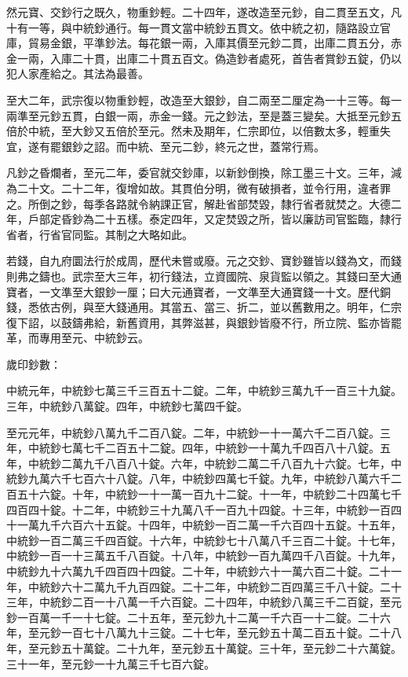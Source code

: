 \begin{pinyinscope}
 然元寶、交鈔行之既久，物重鈔輕。二十四年，遂改造至元鈔，自二貫至五文，凡十有一等，與中統鈔通行。每一貫文當中統鈔五貫文。依中統之初，隨路設立官庫，貿易金銀，平準鈔法。每花銀一兩，入庫其價至元鈔二貫，出庫二貫五分，赤金一兩，入庫二十貫，出庫二十貫五百文。偽造鈔者處死，首告者賞鈔五錠，仍以犯人家產給之。其法為最善。



 至大二年，武宗復以物重鈔輕，改造至大銀鈔，自二兩至二厘定為一十三等。每一兩準至元鈔五貫，白銀一兩，赤金一錢。元之鈔法，至是蓋三變矣。大抵至元鈔五倍於中統，至大鈔又五倍於至元。然未及期年，仁宗即位，以倍數太多，輕重失宜，遂有罷銀鈔之詔。而中統、至元二鈔，終元之世，蓋常行焉。



 凡鈔之昏爛者，至元二年，委官就交鈔庫，以新鈔倒換，除工墨三十文。三年，減為二十文。二十二年，復增如故。其貫伯分明，微有破損者，並令行用，違者罪之。所倒之鈔，每季各路就令納課正官，解赴省部焚毀，隸行省者就焚之。大德二年，戶部定昏鈔為二十五樣。泰定四年，又定焚毀之所，皆以廉訪司官監臨，隸行省者，行省官同監。其制之大略如此。



 若錢，自九府圜法行於成周，歷代未嘗或廢。元之交鈔、寶鈔雖皆以錢為文，而錢則弗之鑄也。武宗至大三年，初行錢法，立資國院、泉貨監以領之。其錢曰至大通寶者，一文準至大銀鈔一厘；曰大元通寶者，一文準至大通寶錢一十文。歷代銅錢，悉依古例，與至大錢通用。其當五、當三、折二，並以舊數用之。明年，仁宗復下詔，以鼓鑄弗給，新舊資用，其弊滋甚，與銀鈔皆廢不行，所立院、監亦皆罷革，而專用至元、中統鈔云。



 歲印鈔數：



 中統元年，中統鈔七萬三千三百五十二錠。二年，中統鈔三萬九千一百三十九錠。三年，中統鈔八萬錠。四年，中統鈔七萬四千錠。



 至元元年，中統鈔八萬九千二百八錠。二年，中統鈔一十一萬六千二百八錠。三年，中統鈔七萬七千二百五十二錠。四年，中統鈔一十萬九千四百八十八錠。五年，中統鈔二萬九千八百八十錠。六年，中統鈔二萬二千八百九十六錠。七年，中統鈔九萬六千七百六十八錠。八年，中統鈔四萬七千錠。九年，中統鈔八萬六千二百五十六錠。十年，中統鈔一十一萬一百九十二錠。十一年，中統鈔二十四萬七千四百四十錠。十二年，中統鈔三十九萬八千一百九十四錠。十三年，中統鈔一百四十一萬九千六百六十五錠。十四年，中統鈔一百二萬一千六百四十五錠。十五年，中統鈔一百二萬三千四百錠。十六年，中統鈔七十八萬八千三百二十錠。十七年，中統鈔一百一十三萬五千八百錠。十八年，中統鈔一百九萬四千八百錠。十九年，中統鈔九十六萬九千四百四十四錠。二十年，中統鈔六十一萬六百二十錠。二十一年，中統鈔六十二萬九千九百四錠。二十二年，中統鈔二百四萬三千八十錠。二十三年，中統鈔二百一十八萬一千六百錠。二十四年，中統鈔八萬三千二百錠，至元鈔一百萬一千一十七錠。二十五年，至元鈔九十二萬一千六百一十二錠。二十六年，至元鈔一百七十八萬九十三錠。二十七年，至元鈔五十萬二百五十錠。二十八年，至元鈔五十萬錠。二十九年，至元鈔五十萬錠。三十年，至元鈔二十六萬錠。三十一年，至元鈔一十九萬三千七百六錠。




\end{pinyinscope}
